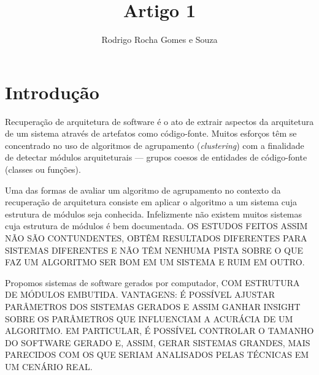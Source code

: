 \documentclass{acm_proc_article-sp}
\begin{document}
\title{Artigo 1} %
\author{Rodrigo Rocha Gomes e Souza}
\maketitle

\begin{abstract}



\end{abstract}

\section{Introdução} %

% 
% 

Recuperação de arquitetura de software é o ato de extrair aspectos da arquitetura de um sistema através de artefatos como código-fonte. Muitos esforços têm se concentrado no uso de algoritmos de agrupamento (\emph{clustering}) com a finalidade de detectar módulos arquiteturais --- grupos coesos de entidades de código-fonte (classes ou funções).

Uma das formas de avaliar um algoritmo de agrupamento no contexto da recuperação de arquitetura consiste em aplicar o algoritmo a um sistema cuja estrutura de módulos seja conhecida. Infelizmente não existem muitos sistemas cuja estrutura de módulos é bem documentada. OS ESTUDOS FEITOS ASSIM NÃO SÃO CONTUNDENTES, OBTÊM RESULTADOS DIFERENTES PARA SISTEMAS DIFERENTES E NÃO TÊM NENHUMA PISTA SOBRE O QUE FAZ UM ALGORITMO SER BOM EM UM SISTEMA E RUIM EM OUTRO.

Propomos sistemas de software gerados por computador, COM ESTRUTURA DE MÓDULOS EMBUTIDA. VANTAGENS: É POSSÍVEL AJUSTAR PARÂMETROS DOS SISTEMAS GERADOS E ASSIM GANHAR INSIGHT SOBRE OS PARÂMETROS QUE INFLUENCIAM A ACURÁCIA DE UM ALGORITMO. EM PARTICULAR, É POSSÍVEL CONTROLAR O TAMANHO DO SOFTWARE GERADO E, ASSIM, GERAR SISTEMAS GRANDES, MAIS PARECIDOS COM OS QUE SERIAM ANALISADOS PELAS TÉCNICAS EM UM CENÁRIO REAL.
\end{document}
